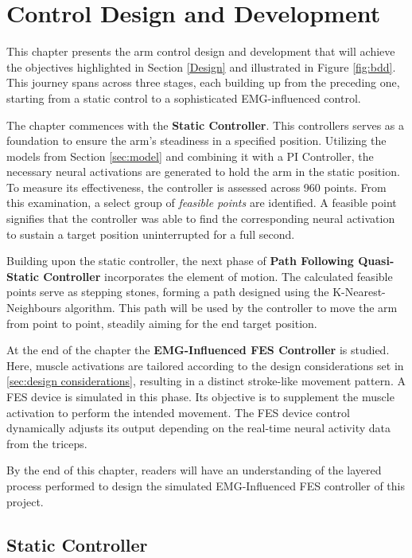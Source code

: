 \chapter{Control Design and Development}

This chapter presents the arm control design and development that will achieve the objectives highlighted in Section \ref{Design} and illustrated in Figure \ref{fig:bdd}. This journey spans across three stages, each building up from the preceding one, starting from a static control to a sophisticated EMG-influenced control.  

The chapter commences with the \textbf{Static Controller}. This controllers serves as a foundation to ensure the arm's steadiness in a specified position. Utilizing the models from Section \ref{sec:model} and combining it with a PI Controller, the necessary neural activations are generated to hold the arm in the static position. To measure its effectiveness, the controller is assessed across 960 points. From this examination, a select group of \textit{feasible points} are identified. A feasible point signifies that the controller was able to find the corresponding neural activation to sustain a target position uninterrupted for a full second. 

Building upon the static controller, the next phase of \textbf{Path Following Quasi-Static Controller} incorporates the element of motion. The calculated feasible points serve as stepping stones, forming a path designed using the K-Nearest-Neighbours algorithm. This path will be used by the controller to move the arm from point to point, steadily aiming for the end target position.

At the end of the chapter the \textbf{EMG-Influenced FES Controller} is studied. Here, muscle activations are tailored according to the design considerations set in \ref{sec:design considerations}, resulting in a distinct stroke-like movement pattern. A FES device is simulated in this phase. Its objective is to supplement the muscle activation to perform the intended movement. The FES device control dynamically adjusts its output depending on the real-time neural activity data from the triceps. 

By the end of this chapter, readers will have an understanding of the layered process performed to design the simulated EMG-Influenced FES controller of this project. 

\section{Static Controller} \label{NeuralController}

